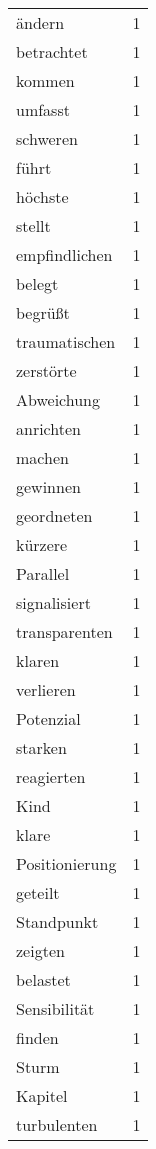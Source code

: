 \begin{tabular}{lr}
ändern & 1 \\
betrachtet & 1 \\
kommen & 1 \\
umfasst & 1 \\
schweren & 1 \\
führt & 1 \\
höchste & 1 \\
stellt & 1 \\
empfindlichen & 1 \\
belegt & 1 \\
begrüßt & 1 \\
traumatischen & 1 \\
zerstörte & 1 \\
Abweichung & 1 \\
anrichten & 1 \\
machen & 1 \\
gewinnen & 1 \\
geordneten & 1 \\
kürzere & 1 \\
Parallel & 1 \\
signalisiert & 1 \\
transparenten & 1 \\
klaren & 1 \\
verlieren & 1 \\
Potenzial & 1 \\
starken & 1 \\
reagierten & 1 \\
Kind & 1 \\
klare & 1 \\
Positionierung & 1 \\
geteilt & 1 \\
Standpunkt & 1 \\
zeigten & 1 \\
belastet & 1 \\
Sensibilität & 1 \\
finden & 1 \\
Sturm & 1 \\
Kapitel & 1 \\
turbulenten & 1 \\
\bottomrule
\end{tabular}
